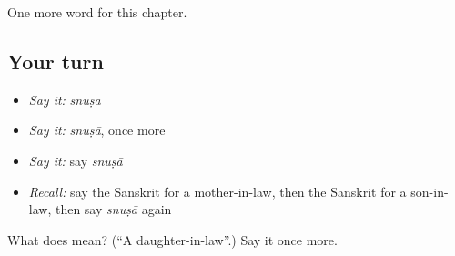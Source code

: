 \begin{grammarlens}[title={What you've built}]
One more word for this chapter.
\end{grammarlens}

\subsection*{Your turn}
\begin{itemize}
\raggedright
  \item \emph{Say it:} \emph{snuṣā}
  \item \emph{Say it:} \emph{snuṣā}, once more
  \item \emph{Say it:} say \emph{snuṣā}
  \item \emph{Recall:} say the Sanskrit for a mother-in-law, then the Sanskrit for a son-in-law, then say \emph{snuṣā} again
\end{itemize}

\begin{tcolorbox}[breakable,colback=teal!4,colframe=teal!35!black,title={Before you move on}]
What does  mean? (\textquotedblleft{}A daughter-in-law\textquotedblright{}.) Say it once more.
\end{tcolorbox}
